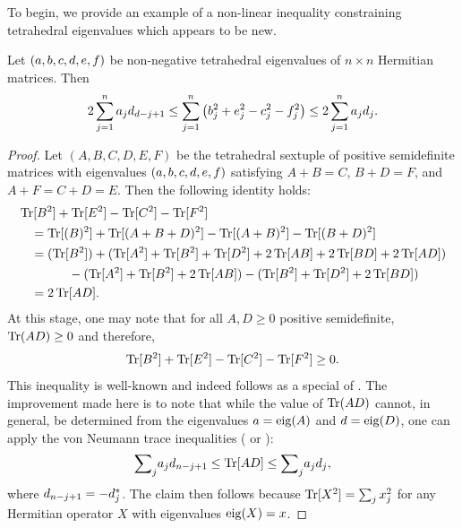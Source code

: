 \documentclass[notitlepage, 10pt]{article}
\begin{document}
To begin, we provide an example of a non-linear inequality constraining tetrahedral eigenvalues which appears to be new.
\begin{prop}
    \label{prop:simple_quadratic}
    Let $(a,b,c,d,e,f)$ be non-negative tetrahedral eigenvalues of $n\times n$ Hermitian matrices.
    Then
    \begin{equation}
        2 \sum_{j=1}^{n}a_jd_{d-j+1} \leq \sum_{j=1}^{n}\left(b_j^2 + e_j^2 - c_j^2 - f_j^2\right) \leq 2 \sum_{j=1}^{n}a_jd_j.
    \end{equation}
\end{prop}
\begin{proof}
    Let $(A,B,C,D,E,F)$ be the tetrahedral sextuple of positive semidefinite matrices 
    with eigenvalues $(a,b,c,d,e,f)$
    satisfying $A+B=C$, $B+D=F$, and $A+F=C+D=E$.
    Then the following identity holds:
    \begin{align}
        \label{eq:quad_identity}
        \begin{split}
            & \operatorname{Tr}[B^2] + \operatorname{Tr}[E^2] - \operatorname{Tr}[C^2] - \operatorname{Tr}[F^2] \\
            &\quad=\operatorname{Tr}[(B)^2] + \operatorname{Tr}[(A+B+D)^2] - \operatorname{Tr}[(A+B)^2] - \operatorname{Tr}[(B+D)^2] \\
            &\quad= 
            (\operatorname{Tr}[B^2])
            +(\operatorname{Tr}[A^2] + \operatorname{Tr}[B^2] + \operatorname{Tr}[D^2] + 2\operatorname{Tr}[AB] + 2\operatorname{Tr}[BD] + 2 \operatorname{Tr}[AD])\\
            &\qquad\qquad-(\operatorname{Tr}[A^2] + \operatorname{Tr}[B^2] + 2\operatorname{Tr}[AB])
            -(\operatorname{Tr}[B^2] + \operatorname{Tr}[D^2] + 2\operatorname{Tr}[BD])\\
            &\quad= 2 \operatorname{Tr}[AD].
        \end{split}
    \end{align}
    At this stage, one may note that for all $A,D \geq 0$ positive semidefinite, $\operatorname{Tr}(AD) \geq 0$ and therefore,
    \begin{equation}
        \label{eq:quadratic_difference_pos}
        \operatorname{Tr}[B^2] + \operatorname{Tr}[E^2] - \operatorname{Tr}[C^2] - \operatorname{Tr}[F^2] \geq 0.
    \end{equation}
    This inequality is well-known and indeed follows as a special of \cite[Proposition 2.3]{sagnol2013approximation}.
    The improvement made here is to note that while the value of $\operatorname{Tr}(AD)$ cannot, in general, be determined from the eigenvalues $a = \operatorname{eig}(A)$ and $d = \operatorname{eig}(D)$, one can apply the von Neumann trace inequalities (\cite[H.1.g \& H.1.h]{marshall2010inequalities} or \cite[Proposition 4.4]{bauschke2001hyperbolic}):
    \begin{equation}
        {\sum}_{j} a_j d_{n-j+1} \leq \operatorname{Tr}[AD] \leq {\sum}_{j} a_j d_j,
    \end{equation} 
    where $d_{n-j+1} = -d^{*}_j$.
    The claim then follows because $\operatorname{Tr}[X^2] = \sum_{j}x_{j}^2$ for any Hermitian operator $X$ with eigenvalues $\operatorname{eig}(X) = x$.
\end{proof}
\end{document}
